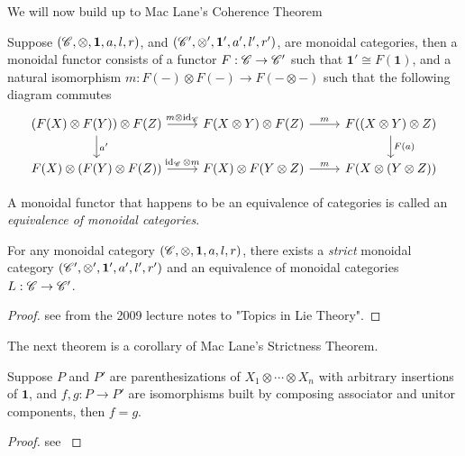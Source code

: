 We will now build up to Mac Lane's Coherence Theorem
\begin{definition}
	Suppose $(\mathscr{C},\otimes,\mathbf{1},a,l,r)$, and $(\mathscr{C}',\otimes',\mathbf{1}',a',l',r')$, are monoidal categories, then a monoidal functor consists of a functor $F:\mathscr{C}\to\mathscr{C}'$ such that $\mathbf{1'}\cong F(\mathbf{1})$, and a natural isomorphism $m:F(-)\otimes F(-)\to F(-\otimes-)$ such that the following diagram commutes
	\[\begin{tikzcd}
(F(X)\otimes F(Y))\otimes F(Z) \arrow[r, "m\otimes\id_\sC"] \arrow[d, "a'"] & F(X\otimes Y)\otimes F(Z) \arrow[r, "m"] & F((X\otimes Y)\otimes Z) \arrow[d, "F(a)"] \\
F(X)\otimes(F(Y)\otimes F(Z)) \arrow[r, "\id_\sC\otimes m"]                 & F(X)\otimes F(Y\otimes Z) \arrow[r, "m"] & F(X\otimes(Y\otimes Z))                   
\end{tikzcd}\]
\end{definition}
A monoidal functor that happens to be an equivalence of categories is called an \emph{equivalence of monoidal categories}.
\begin{theorem}
	For any monoidal category $(\mathscr{C},\otimes,\mathbf{1},a,l,r)$, there exists a \emph{strict} monoidal category $(\mathscr{C}',\otimes',\mathbf{1}',a',l',r')$ and an equivalence of monoidal categories $L:\mathscr{C}\to\mathscr{C}'$.
\end{theorem}
\begin{proof}
	see \cite{Etingof} from the 2009 lecture notes to "Topics in Lie Theory".
\end{proof}
The next theorem is a corollary of Mac Lane's Strictness Theorem.
\begin{theorem}
	Suppose $P$ and $P'$ are parenthesizations of $X_1\otimes\cdots\otimes X_n$ with arbitrary insertions of $\mathbf{1}$, and $f,g:P\to P'$ are isomorphisms built by composing associator and unitor components, then $f=g$.
\end{theorem}
\begin{proof}
	see \cite{Etingof_2009}
\end{proof}
